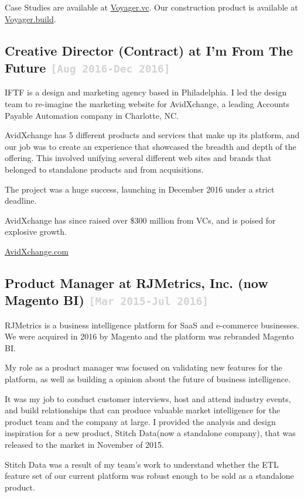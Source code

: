 \documentclass{tufte-handout}
\newcommand{\shstandout}[1]{\textbf{\textcolor{BurntOrange}{#1}}}
\newcommand{\shyears}[1]{\small{\texttt{\textcolor{LightGray}{#1}}}}
\begin{document}
Case Studies are available at \href{http://www.Voyager.vc}{Voyager.vc}.
Our construction product is available at \href{http://www.Voyager.build}{Voyager.build}.


\subsection{\textbf{Creative Director (Contract)} at \shstandout{I'm From The Future} \shyears{[Aug 2016-Dec 2016]}}

IFTF is a design and marketing agency based in Philadelphia. I led the design team to re-imagine the marketing website for AvidXchange, a leading Accounts Payable Automation company in Charlotte, NC.

AvidXchange has 5 different products and services that make up its platform, and our job was to create an experience that showcased the breadth and depth of the offering. This involved unifying several different web sites and brands that belonged to standalone products and from acquisitions.

The project was a huge success, launching in December 2016 under a strict deadline.

AvidXchange has since raised over \$300 million from VCs, and is poised for explosive growth.

\href{https://www.AvidXchange.com}{AvidXchange.com}

\subsection{\textbf{Product Manager} at \shstandout{RJMetrics, Inc. (now Magento BI)} \shyears{[Mar 2015-Jul 2016]}}

RJMetrics is a business intelligence platform for SaaS and e-commerce businesses. We were acquired in 2016 by Magento and the platform was rebranded  Magento BI.

My role as a product manager was focused on validating new features for the platform, as well as building a opinion about the future of business intelligence.

It was my job to conduct customer interviews, host and attend industry events, and build relationships that can produce valuable market intelligence for the product team and the company at large. I provided the analysis and design inspiration for a new product, Stitch Data(now a standalone company), that was released to the market in November of 2015.

Stitch Data was a result of my team's work to understand whether the ETL feature set of our current platform was robust enough to be sold as a standalone product.
\end{document}

